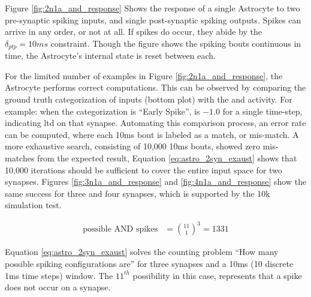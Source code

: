 Figure \ref{fig:2n1a_and_response} Shows the response of a single Astrocyte to
two pre-synaptic spiking inputs, and single post-synaptic spiking outputs. Spikes
can arrive in any order, or not at all. If spikes do occur, they abide by the
$\delta_{ptp}=10ms$ constraint. Though the figure shows the spiking bouts
continuous in time, the Astrocyte's internal state is reset between each.


For the limited number of examples in Figure \ref{fig:2n1a_and_response}, the
Astrocyte performs correct computations. This can be observed by comparing the
ground truth categorization of inputs (bottom plot) with the \dser and \serca
activity. For example: when the categorization is ``Early Spike'', \dser is $-1.0$ for a
single time-step, indicating \Gls{ltd} on that synapse. Automating this comparison
process, an error rate can be computed, where each 10ms bout is labeled as a
match, or mis-match. A more exhaustive search, consisting
of 10,000 10ms bouts, showed zero mis-matches from the expected result, Equation
\ref{eq:astro_2syn_exaust} shows that 10,000 iterations should be sufficient to
cover the entire input space for two synapses. Figures
\ref{fig:3n1a_and_response} and \ref{fig:4n1a_and_response} show the same success
for three and four synapses, which is supported by the 10k simulation test.

\begin{align}
  \textrm{possible AND spikes} &= \binom{11}{1}^3 = 1331 \label{eq:astro_2syn_exaust}
\end{align}

Equation \ref{eq:astro_2syn_exaust} solves the counting problem ``How many
possible spiking configurations are'' for three synapses and a 10ms (10 discrete
1ms time steps) window. The $11^{th}$ possibility in this case, represents that a
spike does not occur on a synapse.



